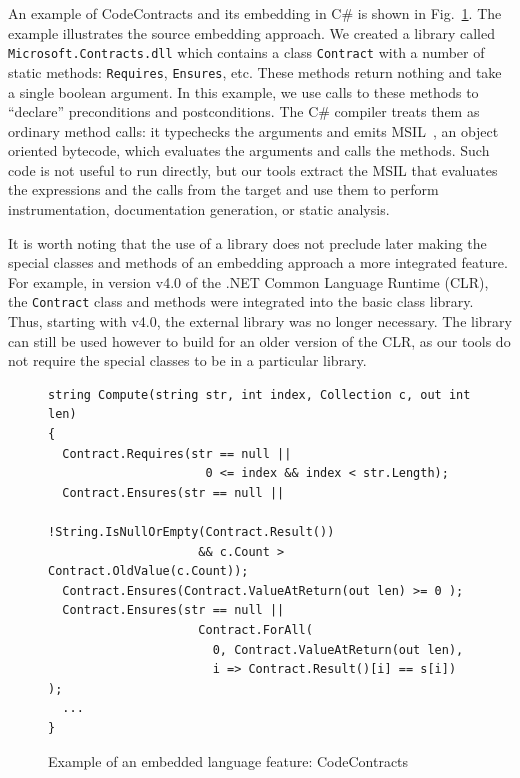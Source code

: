 \documentclass[10pt, conference, compsocconf]{IEEEtran}
\newcommand{\codefamily}{\sffamily}
\newcommand{\csharp}{C\#}
\newcommand{\code}[1]{\lstinline[basicstyle=\codefamily\small]{#1}}
\begin{document}
An example of CodeContracts and its embedding in \csharp{} is shown in
Fig.~\ref{fig:example}. The example illustrates the source embedding
approach. We created a library called
\code{Microsoft.Contracts.dll} which contains a class  \code{Contract}
with a number of static methods:  \code{Requires},
\code{Ensures}, etc. These methods return nothing and take a single
boolean argument. In this example, we use calls to these methods to
``declare'' preconditions and postconditions. The C\# compiler 
treats them as ordinary method calls: it typechecks the arguments
and emits MSIL~\cite{MSIL}, an object oriented
bytecode, which evaluates the arguments and  calls the methods.
Such code is not useful to run directly, but our
tools extract the MSIL that evaluates the expressions and the calls
from the target and use them to perform instrumentation, documentation
generation, or static analysis.

It is worth noting that the use of a library does not preclude
later making the special classes and methods of an embedding approach
a more integrated feature. For example, in version v4.0 of the .NET Common Language
Runtime (CLR), the \code{Contract} class and methods were integrated
into the basic class library. Thus, starting with v4.0, the 
external library was no longer necessary. The  library can still be used however
to build for an older version of the CLR, as our tools do not require
the special classes to be in a particular library.

\begin{figure}[bt]
\vspace*{1mm}
\begin{center}
\begin{lstlisting}
string Compute(string str, int index, Collection c, out int len)
{
  Contract.Requires(str == null ||
                      0 <= index && index < str.Length);
  Contract.Ensures(str == null ||
                     !String.IsNullOrEmpty(Contract.Result())
                     && c.Count > Contract.OldValue(c.Count));
  Contract.Ensures(Contract.ValueAtReturn(out len) >= 0 );
  Contract.Ensures(str == null ||
                     Contract.ForAll(
                       0, Contract.ValueAtReturn(out len),
                       i => Contract.Result()[i] == s[i]) );
  ...
}
\end{lstlisting}
\end{center}
\vspace*{-5mm}
\caption{Example of an embedded language feature: CodeContracts}
\label{fig:example}
\vspace*{-3mm}
\end{figure}
\end{document}
